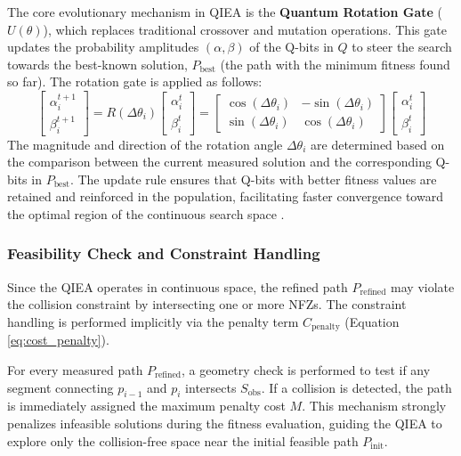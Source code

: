 The core evolutionary mechanism in QIEA is the \textbf{Quantum Rotation Gate} ($U(\theta)$), which replaces traditional crossover and mutation operations. This gate updates the probability amplitudes $(\alpha, \beta)$ of the Q-bits in $Q$ to steer the search towards the best-known solution, $P_{\text{best}}$ (the path with the minimum fitness found so far). The rotation gate is applied as follows:
\begin{equation}
    \begin{bmatrix} \alpha_{i}^{t+1} \\ \beta_{i}^{t+1} \end{bmatrix} = R(\Delta \theta_i) \begin{bmatrix} \alpha_{i}^{t} \\ \beta_{i}^{t} \end{bmatrix} = \begin{bmatrix} \cos(\Delta \theta_i) & -\sin(\Delta \theta_i) \\ \sin(\Delta \theta_i) & \cos(\Delta \theta_i) \end{bmatrix} \begin{bmatrix} \alpha_{i}^{t} \\ \beta_{i}^{t} \end{bmatrix}
    \label{eq:rotation_gate}
\end{equation}
The magnitude and direction of the rotation angle $\Delta \theta_i$ are determined based on the comparison between the current measured solution and the corresponding Q-bits in $P_{\text{best}}$. The update rule ensures that Q-bits with better fitness values are retained and reinforced in the population, facilitating faster convergence toward the optimal region of the continuous search space \cite{ref16}.

\subsubsection{Feasibility Check and Constraint Handling}
Since the QIEA operates in continuous space, the refined path $P_{\text{refined}}$ may violate the collision constraint by intersecting one or more NFZs. The constraint handling is performed implicitly via the penalty term $C_{\text{penalty}}$ (Equation \eqref{eq:cost_penalty}).

For every measured path $P_{\text{refined}}$, a geometry check is performed to test if any segment connecting $p_{i-1}$ and $p_i$ intersects $S_{\text{obs}}$. If a collision is detected, the path is immediately assigned the maximum penalty cost $M$. This mechanism strongly penalizes infeasible solutions during the fitness evaluation, guiding the QIEA to explore only the collision-free space near the initial feasible path $P_{\text{init}}$.

